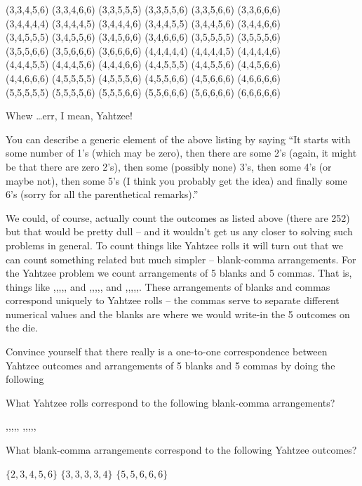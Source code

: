 \begin{tabbing}
(3,3,4,5,6) \> (3,3,4,6,6) \> (3,3,5,5,5) \> (3,3,5,5,6) \> (3,3,5,6,6) \> (3,3,6,6,6) \\ 
(3,4,4,4,4) \> (3,4,4,4,5) \> (3,4,4,4,6) \> (3,4,4,5,5) \> (3,4,4,5,6) \> (3,4,4,6,6) \\ 
(3,4,5,5,5) \> (3,4,5,5,6) \> (3,4,5,6,6) \> (3,4,6,6,6) \> (3,5,5,5,5) \> (3,5,5,5,6) \\ 
(3,5,5,6,6) \> (3,5,6,6,6) \> (3,6,6,6,6) \> (4,4,4,4,4) \> (4,4,4,4,5) \> (4,4,4,4,6) \\ 
(4,4,4,5,5) \> (4,4,4,5,6) \> (4,4,4,6,6) \> (4,4,5,5,5) \> (4,4,5,5,6) \> (4,4,5,6,6) \\ 
(4,4,6,6,6) \> (4,5,5,5,5) \> (4,5,5,5,6) \> (4,5,5,6,6) \> (4,5,6,6,6) \> (4,6,6,6,6) \\ 
(5,5,5,5,5) \> (5,5,5,5,6) \> (5,5,5,6,6) \> (5,5,6,6,6) \> (5,6,6,6,6) \> (6,6,6,6,6) \\ 
\end{tabbing}

Whew \ldots err, I mean, Yahtzee!

You can describe a generic element of the above listing by saying ``It starts
with some number of 1's (which may be zero), then there are some 2's (again,
it might be that there are zero 2's),  then some (possibly none) 3's, 
then some 4's (or maybe not), then some
5's (I think you probably get the idea) and finally some 6's (sorry for 
all the parenthetical remarks).''  

We could, of course, actually count the 
outcomes as listed above (there are 252) but that would be pretty dull -- and
it wouldn't get us any closer to solving such problems in general.  To 
count things like Yahtzee rolls it will turn out that we can count something
related but much simpler -- blank-comma arrangements.  For the Yahtzee
problem we count arrangements of 5 blanks and 5 commas.  That is,
things like {\LARGE \blnk\blnk,\blnk,,\blnk,\blnk,} and 
{\LARGE \blnk\blnk\blnk\blnk\blnk,,,,,} and 
{\LARGE ,,,\blnk\blnk\blnk\blnk\blnk,,}.
These arrangements of blanks and commas correspond uniquely to Yahtzee
rolls -- the commas serve to separate different numerical values
and the blanks are where we would write-in the 5 outcomes on the die.


Convince yourself that there really is a one-to-one correspondence
between Yahtzee outcomes and arrangements of 5 blanks and 5 commas
by doing the following

\begin{exer}
What Yahtzee rolls correspond to the following blank-comma arrangements?

\noindent {\LARGE \blnk,\blnk,\blnk,\blnk,\blnk,} \hspace{\fill} {\LARGE \blnk\blnk,\blnk\blnk\blnk,,,,}  \hspace{\fill} {\LARGE ,,,,,\blnk\blnk\blnk\blnk\blnk}
\medskip

What blank-comma arrangements correspond to the following Yahtzee outcomes?

\noindent $\{2,3,4,5,6\}$  \hspace{\fill} $\{3,3,3,3,4\}$  \hspace{\fill} $\{5,5,6,6,6\}$

\end{exer}   


